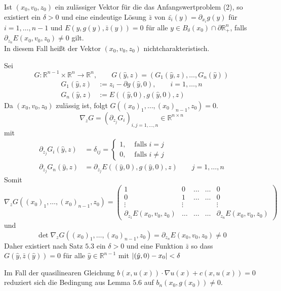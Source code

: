 \begin{lemma}
	Ist $(x_0,v_0,z_0)$ ein zulässiger Vektor für die das Anfangswertproblem (2), so existiert ein $\delta >0$ und eine eindeutige Lösung $\bar{z}$ von 
	$\bar{z_i}(y) = \partial_{x_i}g(y)$ für $i=1,\dots,n-1$ und $E(y,g(y),\bar{z}(y))=0$ für alle $y \in B_{\delta }(x_0) \cap \partial \mathbb{R}^n_+$, falls 
	$\partial_{z_n} E(x_0,v_0,z_0) \neq 0$ gilt. \\
	In diesem Fall heißt der Vektor $(x_0,v_0,z_0)$ nichtcharakteristisch.
\end{lemma}
\begin{beweis}
	Sei
	\[
		G: \mathbb{R}^{n-1} \times \mathbb{R}^n \to \mathbb{R}^n, \qquad G(\hat{y},z)= (G_1(\hat{y},z), \dots, G_n(\hat{y})) 
	\]
	\begin{align*}
		G_1(\hat{y},z) &:= z_i - \partial g(\hat{y},0), \qquad i=1,\dots,n \\
		G_n(\hat{y},z) &:= E((\hat{y},0),g(\hat{y},0),z)
	\end{align*}
	Da $(x_0,v_0,z_0)$ zulässig ist, folgt $G((x_0)_1, \dots, (x_0)_{n-1},z_0)=0$.
	\[
		 \nabla _z G = (\partial_{z_j}G_i)_{i,j=1,\dots,n} \in \mathbb{R}^{n \times n}
	\]
	mit
	\begin{align*}
		\partial_{z_j} G_i ( \hat{y}, z) &= \delta _{ij} = \begin{cases}
			1, &\text{ falls }i = j\\
			0, &\text{ falls }i \neq j
		\end{cases} \\
		\partial_{z_j} G_n(\hat{y},z) &= \partial_{z_j} E((\hat{y},0),g(\hat{y},0),z) \qquad j=1,\dots,n
	\end{align*}
	Somit
	\[
		 \nabla_z G((x_0)_1, \dots, (x_0)_{n-1},z_0) = \begin{pmatrix}
		 	1 & 0 & \dots & \dots & 0 \\
			0 & 1 & \dots & \dots & 0 \\
			\vdots & \vdots & & & \vdots \\
			\partial_{z_1}E(x_0,v_0,z_0) & \dots & \dots & \dots & \partial_{z_n} E(x_0,v_0,z_0)
		 \end{pmatrix}
	\]
	und \[
		\det  \nabla_z G((x_0)_1,\dots,(x_0)_{n-1},z_0) = \partial_{z_n}E(x_0,v_0,z_0) \neq 0
	\]
	Daher existiert nach Satz $5.3$ ein $\delta >0$ und eine Funktion $\bar{z}$ so dass $G(\hat{y},\bar{z}(\hat{y}))=0$ für alle $\hat{y} \in \mathbb{R}^{n-1}$ 
	mit $\lvert(\hat{y},0)-x_0\rvert < \delta $
\end{beweis}

\begin{bemerkung}
	Im Fall der quasilinearen Gleichung $b(x,u(x)) \cdot  \nabla u(x) + c(x,u(x)) = 0$ reduziert sich die Bedingung aus Lemma $5.6$ auf $b_n(x_0,g(x_0)) \neq 0$.
\end{bemerkung}

